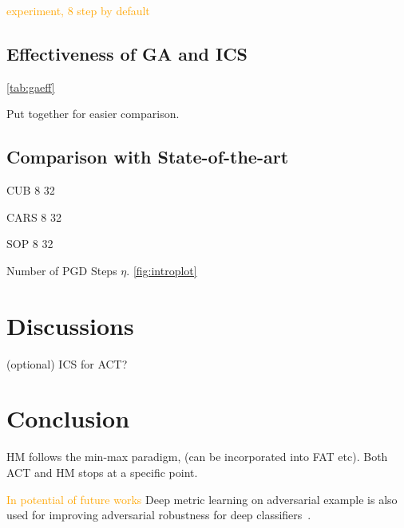 \documentclass[10pt,twocolumn,letterpaper]{article}
\newcommand{\oo}[1]{\textcolor{orange}{#1}}
\begin{document}
\oo{experiment, 8 step by default}

\subsection{Effectiveness of GA and ICS}
\label{sec:43}



\cref{tab:gaeff}



Put together for easier comparison.

\subsection{Comparison with State-of-the-art}



CUB 8 32

CARS 8 32

SOP 8 32

Number of PGD Steps $\eta$.
\cref{fig:introplot}

\section{Discussions}
\label{sec:5}

(optional) ICS for ACT?

\section{Conclusion}
\label{sec:6}

HM follows the min-max paradigm, (can be incorporated into FAT etc).
Both ACT and HM stops at a specific point.

\oo{In potential of future works}
Deep metric learning on adversarial example is also used for improving
adversarial robustness for deep classifiers~\cite{mao2019metric}.

{\small


}


\end{document}
